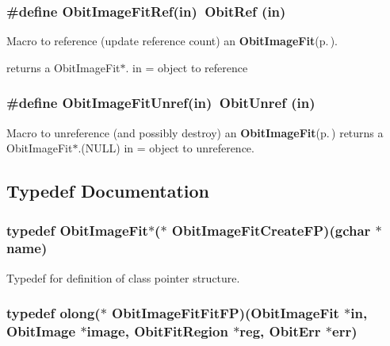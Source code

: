 \subsubsection{\setlength{\rightskip}{0pt plus 5cm}\#define Obit\-Image\-Fit\-Ref(in)\ Obit\-Ref (in)}\label{ObitImageFit_8h_a1}


Macro to reference (update reference count) an {\bf Obit\-Image\-Fit}{\rm (p.\,\pageref{structObitImageFit})}. 

returns a Obit\-Image\-Fit$\ast$. in = object to reference 
\subsubsection{\setlength{\rightskip}{0pt plus 5cm}\#define Obit\-Image\-Fit\-Unref(in)\ Obit\-Unref (in)}\label{ObitImageFit_8h_a0}


Macro to unreference (and possibly destroy) an {\bf Obit\-Image\-Fit}{\rm (p.\,\pageref{structObitImageFit})} returns a Obit\-Image\-Fit$\ast$.(NULL) in = object to unreference. 



\subsection{Typedef Documentation}
\subsubsection{\setlength{\rightskip}{0pt plus 5cm}typedef {\bf Obit\-Image\-Fit}$\ast$($\ast$ {\bf Obit\-Image\-Fit\-Create\-FP})(gchar $\ast$name)}\label{ObitImageFit_8h_a3}


Typedef for definition of class pointer structure. 

\subsubsection{\setlength{\rightskip}{0pt plus 5cm}typedef {\bf olong}($\ast$ {\bf Obit\-Image\-Fit\-Fit\-FP})({\bf Obit\-Image\-Fit} $\ast$in, {\bf Obit\-Image} $\ast$image, {\bf Obit\-Fit\-Region} $\ast$reg, {\bf Obit\-Err} $\ast$err)}\label{ObitImageFit_8h_a4}


